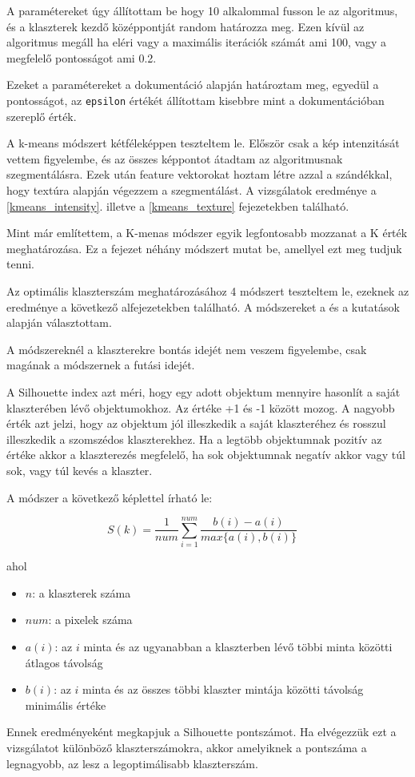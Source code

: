A paramétereket úgy állítottam be hogy 10 alkalommal fusson le az algoritmus, és a klaszterek kezdő középpontját random határozza meg. Ezen kívül az algoritmus megáll ha eléri vagy a maximális iterációk számát ami 100, vagy a megfelelő pontosságot ami 0.2.

Ezeket a paramétereket a \cite{kmeans_opencv} dokumentáció alapján határoztam meg, egyedül a pontosságot, az \texttt{epsilon} értékét állítottam kisebbre mint a dokumentációban szereplő érték.

A k-means módszert kétféleképpen teszteltem le. Először csak a kép intenzitását vettem figyelembe, és az összes képpontot átadtam az algoritmusnak szegmentálásra. Ezek után feature vektorokat hoztam létre azzal a szándékkal, hogy textúra alapján végezzem a szegmentálást. A vizsgálatok eredménye a \ref{kmeans_intensity}. illetve a \ref{kmeans_texture} fejezetekben található.

 \label{optimal_cluster_number}
Mint már említettem, a K-menas módszer egyik legfontosabb mozzanat a K érték meghatározása. Ez a fejezet néhány módszert mutat be, amellyel ezt meg tudjuk tenni.

Az optimális klaszterszám meghatározásához 4 módszert teszteltem le, ezeknek az eredménye a következő alfejezetekben található.
A módszereket a \cite{tomatoleaf} és a \cite{elbow} kutatások alapján választottam.

A módszereknél a klaszterekre bontás idejét nem veszem figyelembe, csak magának a módszernek a futási idejét.


A Silhouette index azt méri, hogy egy adott objektum mennyire hasonlít a saját klaszterében lévő objektumokhoz. Az értéke +1 és -1 között mozog. A nagyobb érték azt jelzi, hogy az objektum jól illeszkedik a saját klaszteréhez és rosszul illeszkedik a szomszédos klaszterekhez. Ha a legtöbb objektumnak pozitív az értéke akkor a klaszterezés megfelelő, ha sok objektumnak negatív akkor vagy túl sok, vagy túl kevés a klaszter.

A módszer a következő képlettel írható le:

\[ S(k)=\frac{1}{num} \sum_{i=1}^{num} \frac{b(i)-a(i)}{max\{a(i),b(i)\}} \quad \]

\noindent ahol
\begin{itemize}
\item $n$: a klaszterek száma
\item $num$: a pixelek száma
\item $a(i)$: az $i$ minta és az ugyanabban a klaszterben lévő többi minta közötti átlagos távolság
\item $b(i)$: az $i$ minta és az összes többi klaszter mintája közötti távolság minimális értéke
\end{itemize}
Ennek eredményeként megkapjuk a Silhouette pontszámot. Ha elvégezzük ezt a vizsgálatot különböző klaszterszámokra, akkor amelyiknek a pontszáma a legnagyobb, az lesz a legoptimálisabb klaszterszám. \cite{tomatoleaf}

